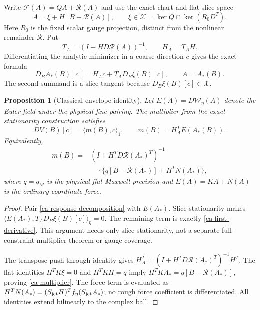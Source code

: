 \documentclass[11pt]{article}
\newtheorem{proposition}[theorem]{Proposition}
\theoremstyle{remark}
\begin{document}
Write $\mathcal F(A)=QA+\mathcal R(A)$ and use the exact
chart and flat-slice space
\[
 A=\xi+H[B-\mathcal R(A)],\qquad
 \xi\in\mathcal X=\ker Q\cap\ker(R_0D^T).
\]
Here $R_0$ is the fixed scalar gauge projection, distinct from
the nonlinear remainder $\mathcal R$. Put
\begin{equation}\label{ca-chart-differential}
 T_A=(I+HD\mathcal R(A))^{-1},\qquad H_A=T_AH.
\end{equation}
Differentiating the analytic minimizer in a coarse direction $c$
gives the exact formula
\begin{equation}\label{ca-response-decomposition}
 D_BA_*(B)[c]=H_Ac+T_AD_B\xi(B)[c],\qquad A=A_*(B).
\end{equation}
The second summand is a slice tangent because
$D_B\xi(B)[c]\in\mathcal X$.

\begin{proposition}[Classical envelope identity]\label{ca-envelope}
Let $E(A)=D\mathcal W_\eta(A)$ denote the Euler field under
the physical fine pairing. The multiplier from the exact
stationarity construction satisfies
\begin{equation}\label{ca-first-derivative}
 DV(B)[c]=\langle m(B),c\rangle_1,\qquad
 m(B)=H_A^TE(A_*(B)).
\end{equation}
Equivalently,
\begin{equation}\label{ca-multiplier}
 \begin{split}
 m(B)={}&(I+H^TD\mathcal R(A_*)^T)^{-1}\\
 &\quad\cdot\{q[B-\mathcal R(A_*)]+H^TN(A_*)\},
 \end{split}
\end{equation}
where $q=q_M$ is the physical flat Maxwell precision and
$E(A)=KA+N(A)$ is the ordinary-coordinate force.
\end{proposition}

\begin{proof}
Pair \eqref{ca-response-decomposition} with $E(A_*)$.
Slice stationarity makes
$\langle E(A_*),T_AD_B\xi(B)[c]\rangle_\eta=0$.
The remaining term is exactly \eqref{ca-first-derivative}.
This argument needs only slice stationarity, not a separate
full-constraint multiplier theorem or gauge coverage.

The transpose push-through identity gives
$H_A^T=(I+H^TD\mathcal R(A_*)^T)^{-1}H^T$.
The flat identities $H^TK\xi=0$ and $H^TKH=q$ imply
$H^TKA_*=q[B-\mathcal R(A_*)]$, proving
\eqref{ca-multiplier}. The force term is evaluated as
$H^TN(A_*)=(S_{\rm jet}H)^Tf_\eta(S_{\rm jet}A_*)$;
no rough force coefficient is differentiated. All identities
extend bilinearly to the complex ball.
\end{proof}
\end{document}
